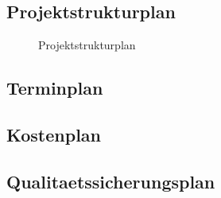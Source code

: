 \documentclass[11pt, a4paper]{article}
\begin{document}
    \subsection{Projektstrukturplan}
      \begin{figure}[h!]
        \caption{Projektstrukturplan}
        \label{fig:psp}
      \end{figure}
      \newpage

    \subsection{Terminplan}
      
      \newpage

    \subsection{Kostenplan}
      
      \newpage

    \subsection{Qualitaetssicherungsplan}
      
      \newpage
\end{document}
